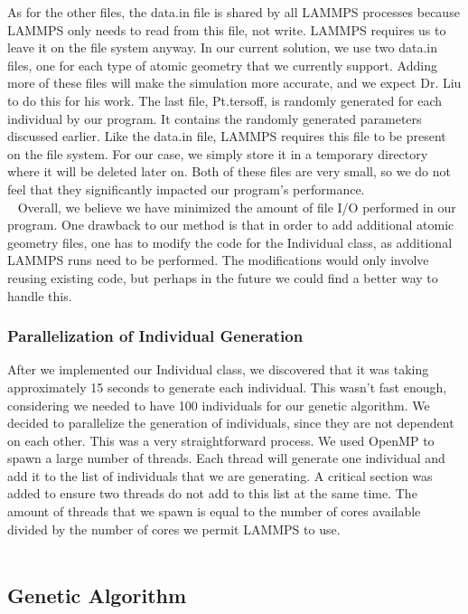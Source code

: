 \documentclass[letterpaper, 12pt]{article}
\begin{document}
\begin{flushleft}
As for the other files, the data.in file is shared by all LAMMPS processes because LAMMPS only needs to read from this file, not write. LAMMPS requires us to leave it on the file system anyway. In our current solution, we use two data.in files, one for each type of atomic geometry that we currently support. Adding more of these files will make the simulation more accurate, and we expect Dr. Liu to do this for his work. The last file, Pt.tersoff, is randomly generated for each individual by our program. It contains the randomly generated parameters discussed earlier. Like the data.in file, LAMMPS requires this file to be present on the file system. For our case, we simply store it in a temporary directory where it will be deleted later on. Both of these files are very small, so we do not feel that they significantly impacted our program's performance. \\
~\newline
Overall, we believe we have minimized the amount of file I/O performed in our program. One drawback to our method is that in order to add additional atomic geometry files, one has to modify the code for the Individual class, as additional LAMMPS runs need to be performed. The modifications would only involve reusing existing code, but perhaps in the future we could find a better way to handle this. 

\subsubsection*{Parallelization of Individual Generation}

After we implemented our Individual class, we discovered that it was taking approximately 15 seconds to generate each individual. This wasn't fast enough, considering we needed to have 100 individuals for our genetic algorithm. We decided to parallelize the generation of individuals, since they are not dependent on each other. This was a very straightforward process. We used OpenMP to spawn a large number of threads. Each thread will generate one individual and add it to the list of individuals that we are generating. A critical section was added to ensure two threads do not add to this list at the same time. The amount of threads that we spawn is equal to the number of cores available divided by the number of cores we permit LAMMPS to use. \\
~\newline

 


\subsection*{Genetic Algorithm}


\end{flushleft}
\end{document}
